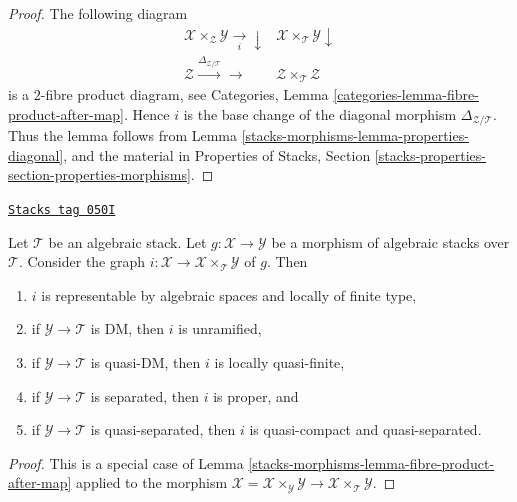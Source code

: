 \begin{proof}
The following diagram
$$
\begin{array}{cc}\mathcal{X} \times_\mathcal{Z} \mathcal{Y} \underset{i}{\longrightarrow}\downarrow & \mathcal{X} \times_\mathcal{T} \mathcal{Y} \downarrow \\ \mathcal{Z} \overset{\Delta_{\mathcal{Z}/\mathcal{T}}}{\longrightarrow}\longrightarrow & \mathcal{Z} \times_\mathcal{T} \mathcal{Z}\end{array}
$$
is a $2$-fibre product diagram, see
Categories, Lemma \ref{categories-lemma-fibre-product-after-map}.
Hence $i$ is the base change of the
diagonal morphism $\Delta_{\mathcal{Z}/\mathcal{T}}$. Thus the lemma follows
from
Lemma \ref{stacks-morphisms-lemma-properties-diagonal},
and the material in
Properties of Stacks,
Section \ref{stacks-properties-section-properties-morphisms}.
\end{proof}

\begin{lemma}
\label{stacks-morphisms-lemma-semi-diagonal}
\href{https://stacks.math.columbia.edu/tag/050I}{\texttt{Stacks tag 050I}}

Let $\mathcal{T}$ be an algebraic stack. Let $g : \mathcal{X} \to \mathcal{Y}$
be a morphism of algebraic stacks over $\mathcal{T}$. Consider the graph
$i : \mathcal{X} \to \mathcal{X} \times_\mathcal{T} \mathcal{Y}$ of $g$. Then
\begin{enumerate}
\item $i$ is representable by algebraic spaces and locally of finite type,
\item if $\mathcal{Y} \to \mathcal{T}$ is DM, then $i$ is unramified,
\item if $\mathcal{Y} \to \mathcal{T}$ is quasi-DM, then $i$ is locally
quasi-finite,
\item if $\mathcal{Y} \to \mathcal{T}$ is separated, then $i$ is proper, and
\item if $\mathcal{Y} \to \mathcal{T}$ is quasi-separated, then $i$ is
quasi-compact and quasi-separated.
\end{enumerate}
\end{lemma}

\begin{proof}
This is a special case of Lemma \ref{stacks-morphisms-lemma-fibre-product-after-map}
applied to the morphism
$\mathcal{X} = \mathcal{X} \times_\mathcal{Y} \mathcal{Y} \to
\mathcal{X} \times_\mathcal{T} \mathcal{Y}$.
\end{proof}

